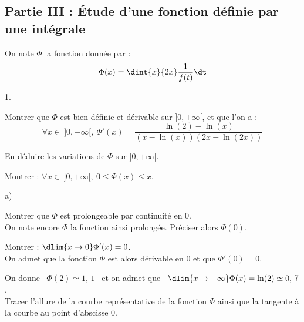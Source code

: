 \documentclass[11pt]{article}%
\begin{document}
\subsection*{Partie III : Étude d'une fonction définie par une 
intégrale}

\noindent
On note $\Phi$ la fonction donnée par :
\[
  \Phi(x) = \dint{x}{2x} \dfrac{1}{f(t)} \dt
\]

\begin{noliste}{1.}
  \setlength{\itemsep}{4mm}
  \setcounter{enumi}{7}
  \item Montrer que $\Phi$ est bien définie et dérivable sur 
  $]0,+\infty[$, et que l'on a :
  \[
    \forall x \in \ ]0,+\infty[, \ \Phi'(x) = \dfrac{\ln(2) - \ln(x)}
    {(x-\ln(x))(2x-\ln(2x))}
  \]
  
  
  
  
  
  
  \item En déduire les variations de $\Phi$ sur $]0,+\infty[$.
  
  

  
  \item Montrer : $\forall x \in \ ]0,+\infty[, \ 0 \leq \Phi(x) \leq 
  x$.
  
  
  
  \item 
  \begin{noliste}{a)}
    \setlength{\itemsep}{2mm}
    \item Montrer que $\Phi$ est prolongeable par continuité en $0$.\\
    On note encore $\Phi$ la fonction ainsi prolongée. Préciser alors 
    $\Phi(0)$.
    
    

    
  \item Montrer : $\dlim{x\to 0} \Phi'(x) =0$.\\
    On admet que la fonction $\Phi$ est alors dérivable en $0$ et que
    $\Phi'(0)=0$.
    
    
  \end{noliste}
  
  
  
  
  \item On donne \ $\Phi(2) \simeq 1, \, 1$ \ et on admet que \ 
  $\dlim{x\to +\infty} \Phi(x) = \ln(2) \simeq 0, \, 7$.\\
  Tracer l'allure de la courbe représentative de la fonction $\Phi$ 
  ainsi que la tangente à la courbe au point d'abscisse $0$.
  
  
\end{noliste}
\end{document}

